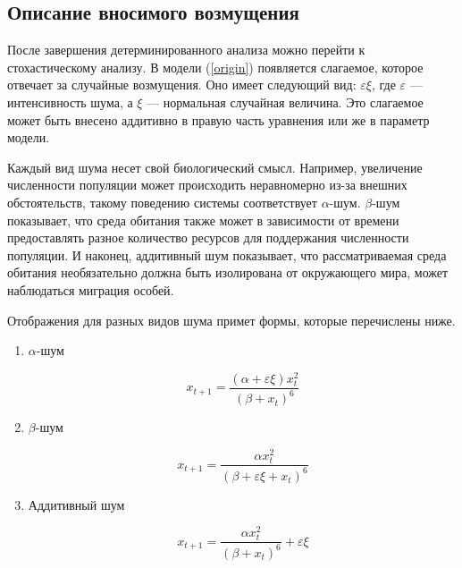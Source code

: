 \subsection{Описание вносимого возмущения}

        После завершения детерминированного анализа можно перейти к стохастическому анализу. В модели (\ref{origin}) появляется слагаемое, которое отвечает за случайные возмущения. Оно имеет следующий вид: \(\varepsilon \xi\), где \(\varepsilon\) --- интенсивность шума, а \(\xi\) --- нормальная случайная величина. Это слагаемое может быть внесено аддитивно в правую часть уравнения или же в параметр модели. 
        
        Каждый вид шума несет свой биологический смысл. Например, увеличение численности популяции может происходить неравномерно из-за внешних обстоятельств, такому поведению системы соответствует \(\alpha\)-шум. \(\beta\)-шум показывает, что среда обитания также может в зависимости от времени предоставлять разное количество ресурсов для поддержания численности популяции. И наконец, аддитивный шум показывает, что рассматриваемая среда обитания необязательно должна быть изолирована от окружающего мира, может наблюдаться миграция особей.
        
        Отображения для разных видов шума примет формы, которые перечислены ниже.

        \begin{enumerate}
            \item \(\alpha\)-шум

                \begin{equation}
                    \label{alpha_chaos}
                    x_{t + 1} = \frac{(\alpha + \varepsilon \xi) x_t^2}{(\beta + x_t)^6}
                \end{equation}
    
            \item \(\beta\)-шум
    
                \begin{equation}
                    \label{beta_chaos}
                    x_{t + 1} = \frac{\alpha x_t^2}{(\beta + \varepsilon \xi + x_t)^6}
                \end{equation}
    
            \item Аддитивный шум
    
                \begin{equation}
                    \label{additive_chaos}
                    x_{t + 1} = \frac{\alpha x_t^2}{(\beta + x_t)^6} + \varepsilon \xi
                \end{equation}
        \end{enumerate}